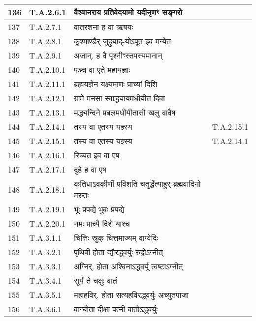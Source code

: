\documentclass[17pt]{extarticle}
\begin{document}
\begin{longtable}{||p{0.4in}||p{0.9in}||p{4.0in}||p{0.9in}||}
        \hline
            136 & T.A.2.6.1 & वैश्वानराय प्रतिवेदयामो यदीनृणꣳ सङ्गरो &      \\
        \hline
            137 & T.A.2.7.1 & वातरशना ह वा ऋषयः &      \\
        \hline
            138 & T.A.2.8.1 & कूश्माण्डैर् जुहुयाद्{-}योऽपूत इव मन्येत &      \\
        \hline
            139 & T.A.2.9.1 & अजान्. ह वै पृश्नीꣳस्तपस्यमानान् &      \\
        \hline
            140 & T.A.2.10.1 & पञ्च वा एते महायज्ञाः &      \\
        \hline
            141 & T.A.2.11.1 & ब्रह्मयज्ञेन यक्ष्यमाणः प्राच्यां दिशि &      \\
        \hline
            142 & T.A.2.12.1 & ग्रामे मनसा स्वाद्ध्यायमधीयीत दिवा &      \\
        \hline
            143 & T.A.2.13.1 & मद्ध्यन्दिने प्रबलमधीयीतासौ खलु वावैष &      \\
        \hline
            144 & T.A.2.14.1 & तस्य वा एतस्य यज्ञ्स्य &  T.A.2.15.1       \\
        \hline
            145 & T.A.2.15.1 & तस्य वा एतस्य यज्ञ्स्य & T.A.2.14.1        \\
        \hline
            146 & T.A.2.16.1 & रिच्यत इव वा एष &      \\
        \hline
            147 & T.A.2.17.1 & दुहे ह वा एष &      \\
        \hline
            148 & T.A.2.18.1 & कतिधाऽवकीर्णी प्रविशति चतुर्द्धेत्याहुर्{-}ब्रह्मवादिनो मरुतः &      \\
        \hline
            149 & T.A.2.19.1 & भूः प्रपद्ये भुवः प्रपद्ये &      \\
        \hline
            150 & T.A.2.20.1 & नमः प्राच्यै दिशे याश्च &      \\
        \hline
            151 & T.A.3.1.1 & चित्तिः स्रुक् चित्तमाज्यम् वाग्वेदिः &      \\
        \hline
            152 & T.A.3.2.1 & पृथिवी होता द्यौरद्ध्वर्युः रुद्रोऽग्नीत् &      \\
        \hline
            153 & T.A.3.3.1 & अग्निर्. होता अश्विनाऽद्ध्वर्यू त्वष्टाऽग्नीत् &      \\
        \hline
            154 & T.A.3.4.1 & सूर्यं ते चक्षुः वातं &      \\
        \hline
            155 & T.A.3.5.1 & महाहविर्. होता सत्यहविरद्ध्वर्युः अच्युतपाजा &      \\
        \hline
            156 & T.A.3.6.1 & वाग्घोता दीक्षा पत्नी वातोऽद्ध्वर्युः &      \\

\end{longtable}
\end{document}
